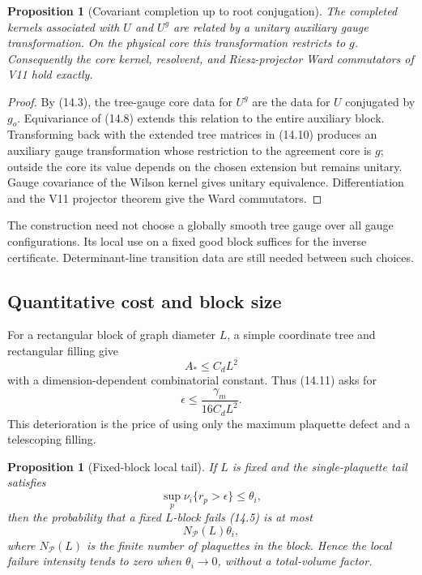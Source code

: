 \documentclass[11pt]{article}
\newtheorem{proposition}[theorem]{Proposition}
\begin{document}
\begin{proposition}[Covariant completion up to root conjugation]
\label{prop:v11v14-covariance}
The completed kernels associated with \(U\) and \(U^g\) are related by a
unitary auxiliary gauge transformation.  On the physical core this
transformation restricts to \(g\).  Consequently the core kernel,
resolvent, and Riesz-projector Ward commutators of V11 hold exactly.
\end{proposition}

\begin{proof}
By (14.3), the tree-gauge core data for \(U^g\) are the data for \(U\)
conjugated by \(g_o\).  Equivariance of (14.8) extends this relation to
the entire auxiliary block.  Transforming back with the extended tree
matrices in (14.10) produces an auxiliary gauge transformation whose
restriction to the agreement core is \(g\); outside the core its value
depends on the chosen extension but remains unitary.  Gauge covariance of
the Wilson kernel gives unitary equivalence.  Differentiation and the V11
projector theorem give the Ward commutators.
\end{proof}

The construction need not choose a globally smooth tree gauge over all
gauge configurations.  Its local use on a fixed good block suffices for
the inverse certificate.  Determinant-line transition data are still
needed between such choices.

\subsection{Quantitative cost and block size}

For a rectangular block of graph diameter \(L\), a simple coordinate
tree and rectangular filling give
\[
 A_*\leq C_dL^2
 \tag{14.15}
\]
with a dimension-dependent combinatorial constant.  Thus (14.11) asks
for
\[
 \epsilon\leq\frac{\gamma_m}{16C_dL^2}.
 \tag{14.16}
\]
This deterioration is the price of using only the maximum plaquette
defect and a telescoping filling.

\begin{proposition}[Fixed-block local tail]
\label{prop:v11v14-local-tail}
If \(L\) is fixed and the single-plaquette tail satisfies
\[
 \sup_p\nu_i\{r_p>\epsilon\}\leq\theta_i,
 \tag{14.17}
\]
then the probability that a fixed \(L\)-block fails (14.5) is at most
\[
 N_{\mathcal P}(L)\theta_i,
 \tag{14.18}
\]
where \(N_{\mathcal P}(L)\) is the finite number of plaquettes in the
block.  Hence the local failure intensity tends to zero when
\(\theta_i\to0\), without a total-volume factor.
\end{proposition}
\end{document}
